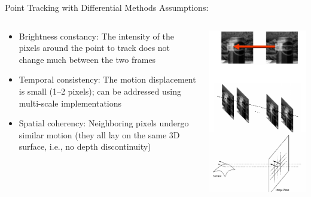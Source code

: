 \begin{frame}{Point Tracking with Differential Methods}
  Assumptions:

  \begin{columns}
    \begin{column}{0.7\textwidth}
      \begin{itemize}
        \item Brightness constancy: The intensity of the pixels around the point to track does not change much between the two frames
        \item Temporal consistency: The motion displacement is small (1–2 pixels); can be addressed using multi-scale implementations
        \item Spatial coherency: Neighboring pixels undergo similar motion (they all lay on the same 3D surface, i.e., no depth discontinuity)
    \end{itemize}
    \end{column}
    \begin{column}{0.3\textwidth}  %
      \begin{center}
      \includegraphics[width=0.7\columnwidth]{./images/optical_flow/point_tracking_differential_methods_properties.pdf}
      \end{center}
    \end{column}
  \end{columns}

\end{frame}


